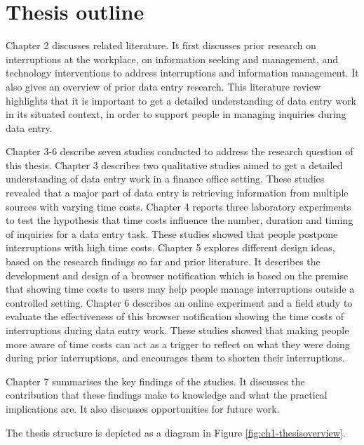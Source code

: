 \section{Thesis outline}
Chapter 2 discusses related literature. It first discusses prior research on interruptions at the workplace, on information seeking and management, and technology interventions to address interruptions and information management. It also gives an overview of prior data entry research. This literature review highlights that it is important to get a detailed understanding of data entry work in its situated context, in order to support people in managing inquiries during data entry. 

Chapter 3-6 describe seven studies conducted to address the research question of this thesis. Chapter 3 describes two qualitative studies aimed to get a detailed understanding of data entry work in a finance office setting. These studies revealed that a major part of data entry is retrieving information from multiple sources with varying time costs. Chapter 4 reports three laboratory experiments to test the hypothesis that time costs influence the number, duration and timing of inquiries for a data entry task. These studies showed that people postpone interruptions with high time costs. Chapter 5 explores different design ideas, based on the research findings so far and prior literature. It describes the development and design of a browser notification which is based on the premise that showing time costs to users may help people manage interruptions outside a controlled setting. Chapter 6 describes an online experiment and a field study to evaluate the effectiveness of this browser notification showing the time costs of interruptions during data entry work. These studies showed that making people more aware of time costs can act as a trigger to reflect on what they were doing during prior interruptions, and encourages them to shorten their interruptions.

Chapter 7 summarises the key findings of the studies. It discusses the contribution that these findings make to knowledge and what the practical implications are. It also discusses opportunities for future work. 

The thesis structure is depicted as a diagram in Figure \ref{fig:ch1-thesisoverview}.

